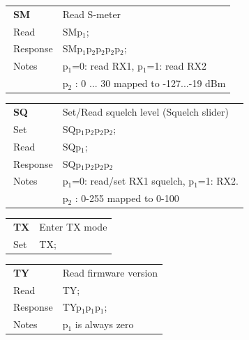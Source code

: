 \documentclass[12pt]{book}
\begin{document}
\begin{center}
\begin{tabular}{|p{2cm}|p{11cm}|}
\toprule
$\phantom{\Big|}$\textbf{\large SM} & Read S-meter \\\cline{1-2}
$\phantom{\Big|}${\large Read} & {SMp$_1$;} \\\hline
$\phantom{\Big|}${\large Response} & {SMp$_1$p$_2$p$_2$p$_2$p$_2$;} \\\hline
$\phantom{\Big|}${\large Notes} & \multicolumn{1}{|p{11cm}|}{p$_1$=0: read RX1, p$_1$=1: read RX2} \\
 & \multicolumn{1}{|p{11cm}|}{p$_2$ : 0 ... 30 mapped to -127...-19 dBm} \\
\bottomrule
\end{tabular}
\end{center}

\begin{center}
\begin{tabular}{|p{2cm}|p{11cm}|}
\toprule
$\phantom{\Big|}$\textbf{\large SQ} & Set/Read squelch level (Squelch slider) \\\cline{1-2}
$\phantom{\Big|}${\large Set} & {SQp$_1$p$_2$p$_2$p$_2$;} \\\hline
$\phantom{\Big|}${\large Read} & {SQp$_1$;} \\\hline
$\phantom{\Big|}${\large Response} & {SQp$_1$p$_2$p$_2$p$_2$} \\\hline
$\phantom{\Big|}${\large Notes} & \multicolumn{1}{|p{11cm}|}{p$_1$=0: read/set RX1 squelch, p$_1$=1: RX2.} \\
 & \multicolumn{1}{|p{11cm}|}{p$_2$ : 0-255 mapped to 0-100} \\
\bottomrule
\end{tabular}
\end{center}

\begin{center}
\begin{tabular}{|p{2cm}|p{11cm}|}
\toprule
$\phantom{\Big|}$\textbf{\large TX} & Enter TX mode \\\cline{1-2}
$\phantom{\Big|}${\large Set} & {TX;} \\\hline
\bottomrule
\end{tabular}
\end{center}

\begin{center}
\begin{tabular}{|p{2cm}|p{11cm}|}
\toprule
$\phantom{\Big|}$\textbf{\large TY} & Read firmware version \\\cline{1-2}
$\phantom{\Big|}${\large Read} & {TY;} \\\hline
$\phantom{\Big|}${\large Response} & {TYp$_1$p$_1$p$_1$;} \\\hline
$\phantom{\Big|}${\large Notes} & \multicolumn{1}{|p{11cm}|}{p$_1$ is always zero} \\
\bottomrule
\end{tabular}
\end{center}
\end{document}
